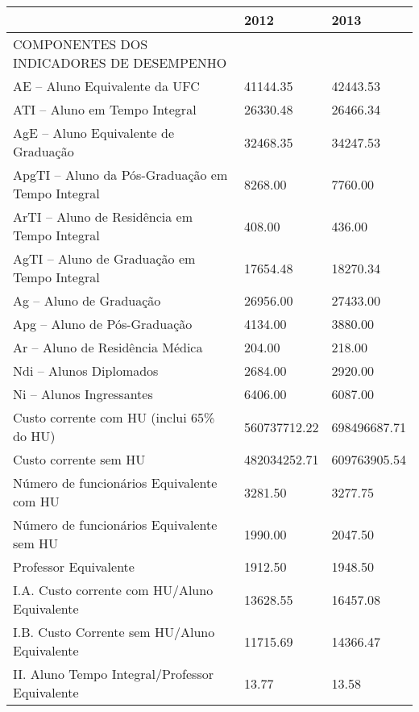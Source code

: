 \documentclass{report}
\begin{document}
\begin{tabular}{lll}
\toprule
{} &          2012 &          2013 \\
\midrule
COMPONENTES DOS INDICADORES DE DESEMPENHO                   &               &               \\
AE – Aluno Equivalente da UFC                              &  41144.35 &  42443.53 \\
ATI – Aluno em Tempo Integral                               &  26330.48 &  26466.34 \\
AgE – Aluno Equivalente de Graduação                        &  32468.35 &  34247.53 \\
ApgTI – Aluno da Pós-Graduação em Tempo Integral            &  8268.00 &  7760.00 \\
ArTI – Aluno de Residência em Tempo Integral                &  408.00 &  436.00 \\
AgTI – Aluno de Graduação em Tempo Integral                 &  17654.48 &  18270.34 \\
Ag – Aluno de Graduação                                     &  26956.00 &  27433.00 \\
Apg – Aluno de Pós-Graduação                                &  4134.00 &  3880.00 \\
Ar – Aluno de Residência Médica                             &  204.00 &  218.00 \\
Ndi – Alunos Diplomados                                     &  2684.00 &  2920.00 \\
Ni – Alunos Ingressantes                                    &  6406.00 &  6087.00 \\
Custo corrente com HU (inclui 65\% do HU)                   &  560737712.22 &  698496687.71 \\
Custo corrente sem HU                                       &  482034252.71 &  609763905.54 \\
Número de funcionários Equivalente com HU                   &  3281.50 &  3277.75 \\
Número de funcionários Equivalente sem HU                   &  1990.00 &  2047.50 \\
Professor Equivalente                                       &  1912.50 &  1948.50 \\
I.A. Custo corrente com HU/Aluno Equivalente                &  13628.55 &  16457.08 \\
I.B. Custo Corrente sem HU/Aluno Equivalente                &  11715.69 &  14366.47 \\
II. Aluno Tempo Integral/Professor Equivalente              &  13.77 &  13.58 \\

\end{tabular}
\end{document}
